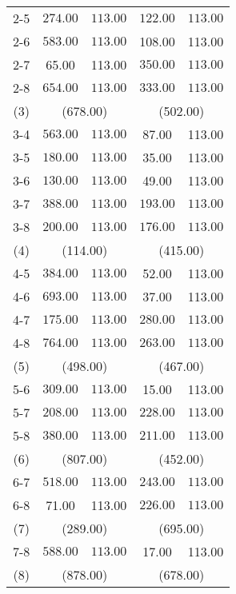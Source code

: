 \begin{table}[ht]
\begin{tabular*}{\textwidth}{@{\extracolsep{\fill} }ccccc}
  2-5 & \(\mathbf{274.00}\) & \(\mathbf{113.00}\) & \(\mathbf{122.00}\) & \(\mathbf{113.00}\) \\ 
  2-6 & \(\mathbf{583.00}\) & \(\mathbf{113.00}\) & 108.00 & 113.00 \\ 
  2-7 & 65.00 & 113.00 & \(\mathbf{350.00}\) & \(\mathbf{113.00}\) \\ 
  2-8 & \(\mathbf{654.00}\) & \(\mathbf{113.00}\) & \(\mathbf{333.00}\) & \(\mathbf{113.00}\) \\ 
   [1ex]
(3) & \multicolumn{2}{c}{(678.00)} & \multicolumn{2}{c}{(502.00)} \\   
   3-4 & \(\mathbf{563.00}\) & \(\mathbf{113.00}\) & 87.00 & 113.00 \\ 
  3-5 & \(\mathbf{180.00}\) & \(\mathbf{113.00}\) & 35.00 & 113.00 \\ 
  3-6 & \(\mathbf{130.00}\) & \(\mathbf{113.00}\) & 49.00 & 113.00 \\ 
  3-7 & \(\mathbf{388.00}\) & \(\mathbf{113.00}\) & \(\mathbf{193.00}\) & \(\mathbf{113.00}\) \\ 
  3-8 & \(\mathbf{200.00}\) & \(\mathbf{113.00}\) & \(\mathbf{176.00}\) & \(\mathbf{113.00}\) \\ 
   [1ex]
(4) & \multicolumn{2}{c}{(114.00)} & \multicolumn{2}{c}{(415.00)} \\   
   4-5 & \(\mathbf{384.00}\) & \(\mathbf{113.00}\) & 52.00 & 113.00 \\ 
  4-6 & \(\mathbf{693.00}\) & \(\mathbf{113.00}\) & 37.00 & 113.00 \\ 
  4-7 & \(\mathbf{175.00}\) & \(\mathbf{113.00}\) & \(\mathbf{280.00}\) & \(\mathbf{113.00}\) \\ 
  4-8 & \(\mathbf{764.00}\) & \(\mathbf{113.00}\) & \(\mathbf{263.00}\) & \(\mathbf{113.00}\) \\ 
   [1ex]
(5) & \multicolumn{2}{c}{(498.00)} & \multicolumn{2}{c}{(467.00)} \\   
   5-6 & \(\mathbf{309.00}\) & \(\mathbf{113.00}\) & 15.00 & 113.00 \\ 
  5-7 & \(\mathbf{208.00}\) & \(\mathbf{113.00}\) & \(\mathbf{228.00}\) & \(\mathbf{113.00}\) \\ 
  5-8 & \(\mathbf{380.00}\) & \(\mathbf{113.00}\) & \(\mathbf{211.00}\) & \(\mathbf{113.00}\) \\ 
   [1ex]
(6) & \multicolumn{2}{c}{(807.00)} & \multicolumn{2}{c}{(452.00)} \\    
   6-7 & \(\mathbf{518.00}\) & \(\mathbf{113.00}\) & \(\mathbf{243.00}\) & \(\mathbf{113.00}\) \\ 
  6-8 & 71.00 & 113.00 & \(\mathbf{226.00}\) & \(\mathbf{113.00}\) \\ 
   [1ex]
(7) & \multicolumn{2}{c}{(289.00)} & \multicolumn{2}{c}{(695.00)} \\   
   7-8 & \(\mathbf{588.00}\) & \(\mathbf{113.00}\) & 17.00 & 113.00 \\ 
   (8) & \multicolumn{2}{c}{(878.00)} & \multicolumn{2}{c}{(678.00)} \\
   \bottomrule
\end{tabular*}

\end{table}
